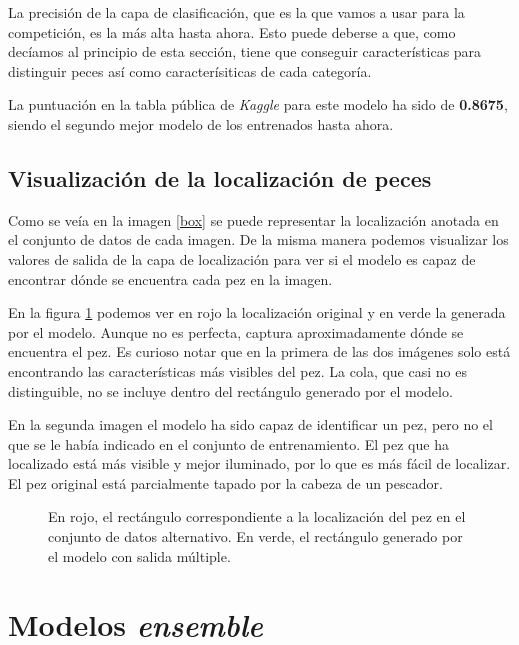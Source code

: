 La precisión de la capa de clasificación, que es la que vamos a usar para la
competición, es la más alta hasta ahora. Esto puede deberse a que, como
decíamos al principio de esta sección, tiene que conseguir características para
distinguir peces así como caracterísiticas de cada categoría.

La puntuación en la tabla pública de \textit{Kaggle} para este modelo ha sido
de \textbf{0.8675}, siendo el segundo mejor modelo de los entrenados hasta ahora.

\subsection{Visualización de la localización de peces}

Como se veía en la imagen \ref{box} se puede representar la localización anotada
en el conjunto de datos de cada imagen. De la misma manera podemos visualizar
los valores de salida de la capa de localización para ver si el modelo es capaz
de encontrar dónde se encuentra cada pez en la imagen.

En la figura \ref{predicted_boxes_1} podemos ver en rojo la localización original
y en verde la generada por el modelo. Aunque no es perfecta, captura
aproximadamente dónde se encuentra el pez. Es curioso notar que en la primera de
las dos imágenes solo está encontrando las características más visibles del pez.
La cola, que casi no es distinguible, no se incluye dentro del rectángulo
generado por el modelo.

En la segunda imagen el modelo ha sido capaz de identificar un pez, pero no el que
se le había indicado en el conjunto de entrenamiento. El pez que ha localizado
está más visible y mejor iluminado, por lo que es más fácil de localizar. El pez
original está parcialmente tapado por la cabeza de un pescador.

\begin{figure}
  \caption{En rojo, el rectángulo correspondiente a la localización del pez en
  el conjunto de datos alternativo. En verde, el rectángulo generado por el
  modelo con salida múltiple.}
\label{predicted_boxes_1}
\end{figure}


\section{Modelos \textit{ensemble}}

